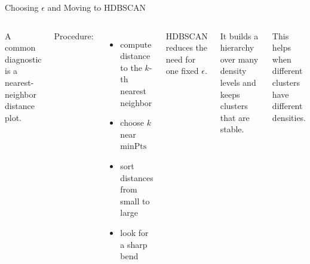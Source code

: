 \documentclass[aspectratio=169]{beamer}
\begin{document}

\begin{frame}{Choosing \(\epsilon\) and Moving to HDBSCAN}
\begin{columns}[T,onlytextwidth]


A common diagnostic is a nearest-neighbor distance plot.

\vspace{0.5em}

Procedure:
\begin{itemize}
\item compute distance to the \(k\)-th nearest neighbor
\item choose \(k\) near \(\mathrm{minPts}\)
\item sort distances from small to large
\item look for a sharp bend
\end{itemize}


HDBSCAN reduces the need for one fixed \(\epsilon\).

\vspace{0.5em}

It builds a hierarchy over many density levels and keeps clusters that are stable.

\vspace{0.5em}

This helps when different clusters have different densities.

\end{columns}
\end{frame}

\end{document}
